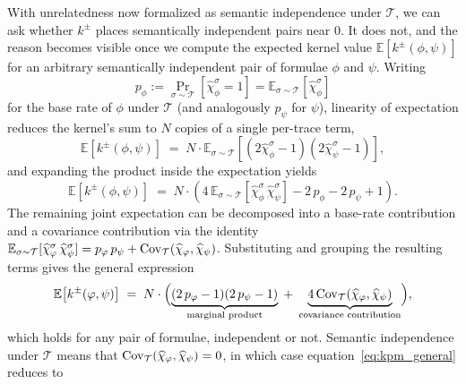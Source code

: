 \documentclass[titlepage,a4paper,11pt]{report}
\begin{document}
    With unrelatedness now formalized as semantic independence under $\mathcal{T}$, we can ask whether $k^\pm$ places semantically independent pairs near $0$. It does not, and the reason becomes visible once we compute the expected kernel value $\mathbb{E}\!\left[k^\pm(\phi, \psi)\right]$ for an arbitrary semantically independent pair of formulae $\phi$ and $\psi$. Writing
    \begin{equation}
    p_\phi := \Pr_{\sigma \sim \mathcal{T}}[\widehat\chi^\sigma_\phi = 1] = \mathbb{E}_{\sigma \sim \mathcal{T}}[\widehat\chi^\sigma_\phi]
    \end{equation}
    for the base rate of $\phi$ under $\mathcal{T}$ (and analogously $p_\psi$ for $\psi$), linearity of expectation reduces the kernel's sum to $N$ copies of a single per-trace term,
    \begin{equation}
        \mathbb{E}\!\left[k^\pm(\phi, \psi)\right]
        \;=\;
        N \cdot \mathbb{E}_{\sigma \sim \mathcal{T}}\!\left[(2\widehat\chi^\sigma_\phi - 1)(2\widehat\chi^\sigma_\psi - 1)\right],
    \end{equation}
    and expanding the product inside the expectation yields
    \begin{equation}
        \mathbb{E}\!\left[k^\pm(\phi, \psi)\right]
        \;=\;
        N \cdot \left(4\,\mathbb{E}_{\sigma \sim \mathcal{T}}\!\left[\widehat\chi^\sigma_\phi\, \widehat\chi^\sigma_\psi\right] - 2\,p_\phi - 2\,p_\psi + 1\right).
    \end{equation}
    The remaining joint expectation can be decomposed into a base-rate contribution and a covariance contribution via the identity $\mathbb{E}_{\sigma \sim \mathcal{T}}[\widehat\chi^\sigma_\varphi\, \widehat\chi^\sigma_\psi] = p_\varphi\, p_\psi + \mathrm{Cov}_{\mathcal{T}}(\widehat\chi_\varphi, \widehat\chi_\psi)$. Substituting and grouping the resulting terms gives the general expression
    \begin{equation}\label{eq:kpm_general}
        \mathbb{E}\!\left[k^\pm(\varphi, \psi)\right]
        \;=\;
        N \cdot \Bigl(
            \underbrace{(2\,p_\varphi - 1)(2\,p_\psi - 1)}_{\text{marginal product}}
            \;+\;
            \underbrace{4\,\mathrm{Cov}_{\mathcal{T}}(\widehat\chi_\varphi, \widehat\chi_\psi)}_{\text{covariance contribution}}
        \Bigr),
    \end{equation}
    which holds for any pair of formulae, independent or not. Semantic independence under $\mathcal{T}$ means that $\mathrm{Cov}_{\mathcal{T}}(\widehat\chi_\varphi, \widehat\chi_\psi) = 0$, in which case equation~\eqref{eq:kpm_general} reduces to
\end{document}
